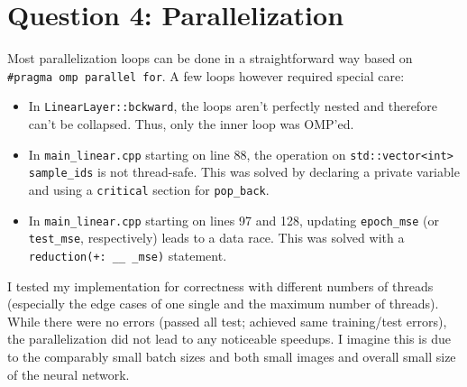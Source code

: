 \documentclass[11pt,a4paper]{article}
\begin{document}
\section{Question 4: Parallelization}

Most parallelization loops can be done in a straightforward way based on
\texttt{\#pragma omp parallel for}. A few loops however required special care:

\begin{itemize}
    \item In \texttt{LinearLayer::bckward}, the loops aren't perfectly nested and therefore can't be collapsed. Thus, only the inner loop was OMP'ed.
    \item In \texttt{main\_linear.cpp} starting on line 88, the operation on \texttt{std::vector<int> sample\_ids} is not thread-safe. This was solved by declaring a private variable and using a \texttt{critical} section for \texttt{pop\_back}. 
    \item In \texttt{main\_linear.cpp} starting on lines 97 and 128, updating \texttt{epoch\_mse} (or \texttt{test\_mse}, respectively) leads to a data race. This was solved with a \texttt{reduction(+: \_\_ \_mse)} statement.
\end{itemize}        

I tested my implementation for correctness with different numbers of threads (especially the edge cases
of one single and the maximum number of threads). While there were no errors (passed all test; achieved same training/test errors), the parallelization
did not lead to any noticeable speedups. I imagine this is due to the comparably small batch sizes
and both small images and overall small size of the neural network.
\end{document}
